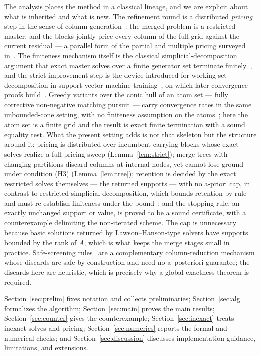 \documentclass[pdflatex,sn-mathphys-num]{sn-jnl}
\theoremstyle{thmstyleone}
\theoremstyle{thmstyletwo}
\begin{document}
The analysis places the method in a classical lineage, and we are
explicit about what is inherited and what is new. The refinement round
is a distributed \emph{pricing} step in the sense of column
generation~\cite{dantzig1960,gilmore1961,lubbecke2005}: the merged
problem is a restricted master, and the blocks jointly price every
column of the full grid against the current residual --- a parallel
form of the partial and multiple pricing surveyed
in~\cite{lubbecke2005}. The finiteness mechanism itself is the
classical simplicial-decomposition argument that exact master solves
over a finite generator set terminate
finitely~\cite{vonhohenbalken1977,hearn1985,garcia2003}, and the
strict-improvement step is the device introduced for working-set
decomposition in support vector machine training~\cite{osuna1997}, on
which later convergence proofs build~\cite{lin2001}. Greedy variants over the conic
hull of an atom set --- fully corrective non-negative matching
pursuit --- carry convergence rates in the same unbounded-cone
setting, with no finiteness assumption on the
atoms~\cite{locatello2017}; here the atom set is a finite grid and
the result is exact finite termination with a sound equality test.
What the present setting adds is not that skeleton but the structure
around it: pricing is distributed over incumbent-carrying blocks whose
exact solves realize a full pricing sweep (Lemma~\ref{lem:strict});
merge trees with changing partitions discard columns at internal
nodes, yet cannot lose ground under condition (H3)
(Lemma~\ref{lem:tree}); retention is decided by the exact restricted
solves themselves --- the returned supports --- with no a-priori cap,
in contrast to restricted simplicial decomposition, which bounds
retention by rule and must re-establish finiteness under the
bound~\cite{hearn1985}; and the stopping rule, an exactly unchanged
support or value, is proved to be a sound certificate, with a
counterexample delimiting the
non-iterated scheme. The cap is unnecessary because basic solutions
returned by Lawson--Hanson-type solvers have supports bounded by the
rank of $A$, which is what keeps the merge stages small in practice. Safe-screening
rules~\cite{folberth2020} are a complementary column-reduction
mechanism whose discards are safe by construction and need no
a~posteriori guarantee; the discards here are heuristic, which is
precisely why a global exactness theorem is required.

Section~\ref{sec:prelim} fixes notation and collects preliminaries;
Section~\ref{sec:alg} formalizes the algorithm;
Section~\ref{sec:main} proves the main results;
Section~\ref{sec:counter} gives the counterexample;
Section~\ref{sec:inexact} treats inexact solves and pricing;
Section~\ref{sec:numerics} reports the formal and numerical checks; and
Section~\ref{sec:discussion} discusses implementation guidance,
limitations, and extensions.
\end{document}
